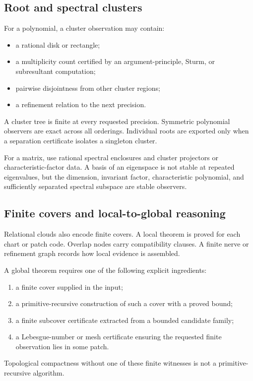 \subsection{Root and spectral clusters}

For a polynomial, a cluster observation may contain:
\begin{itemize}
\item a rational disk or rectangle;
\item a multiplicity count certified by an argument-principle, Sturm, or
subresultant computation;
\item pairwise disjointness from other cluster regions;
\item a refinement relation to the next precision.
\end{itemize}
A cluster tree is finite at every requested precision.  Symmetric polynomial
observers are exact across all orderings.  Individual roots are exported only
when a separation certificate isolates a singleton cluster.

For a matrix, use rational spectral enclosures and cluster projectors or
characteristic-factor data.  A basis of an eigenspace is not stable at repeated
eigenvalues, but the dimension, invariant factor, characteristic polynomial,
and sufficiently separated spectral subspace are stable observers.

\subsection{Finite covers and local-to-global reasoning}

Relational clouds also encode finite covers.  A local theorem is proved for
each chart or patch code.  Overlap nodes carry compatibility clauses.  A finite
nerve or refinement graph records how local evidence is assembled.

A global theorem requires one of the following explicit ingredients:
\begin{enumerate}
\item a finite cover supplied in the input;
\item a primitive-recursive construction of such a cover with a proved bound;
\item a finite subcover certificate extracted from a bounded candidate family;
\item a Lebesgue-number or mesh certificate ensuring the requested finite
observation lies in some patch.
\end{enumerate}
Topological compactness without one of these finite witnesses is not a
primitive-recursive algorithm.

